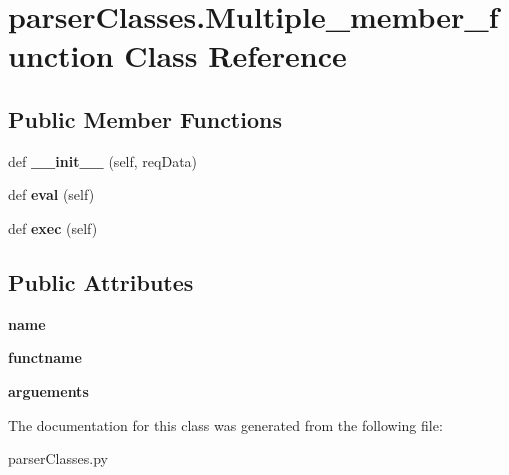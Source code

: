 \hypertarget{classparser_classes_1_1_multiple__member__function}{}\section{parser\+Classes.\+Multiple\+\_\+member\+\_\+function Class Reference}
\label{classparser_classes_1_1_multiple__member__function}
\subsection*{Public Member Functions}
\begin{DoxyCompactItemize}
\item 
\mbox{\label{classparser_classes_1_1_multiple__member__function_a49138664c1c079a08daebd21d676616f}} 
def {\bfseries \+\_\+\+\_\+init\+\_\+\+\_\+} (self, req\+Data)
\item 
\mbox{\label{classparser_classes_1_1_multiple__member__function_abbd74e3f6048c0feabfe52e257cbd91a}} 
def {\bfseries eval} (self)
\item 
\mbox{\label{classparser_classes_1_1_multiple__member__function_a158a2a6d96d99c42350fe9245614a9ee}} 
def {\bfseries exec} (self)
\end{DoxyCompactItemize}
\subsection*{Public Attributes}
\begin{DoxyCompactItemize}
\item 
\mbox{\label{classparser_classes_1_1_multiple__member__function_a841b86dab291bf9deb8f873f58864f9e}} 
{\bfseries name}
\item 
\mbox{\label{classparser_classes_1_1_multiple__member__function_a69614fc7d47fe2f241bbe186ac027b56}} 
{\bfseries functname}
\item 
\mbox{\label{classparser_classes_1_1_multiple__member__function_a444d7614f6b7aa98ab83c1ff8f1fbe7c}} 
{\bfseries arguements}
\end{DoxyCompactItemize}


The documentation for this class was generated from the following file\+:\begin{DoxyCompactItemize}
\item 
parser\+Classes.\+py\end{DoxyCompactItemize}

